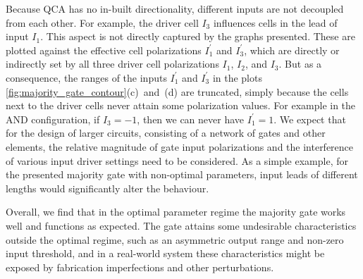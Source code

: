 Because QCA has no in-built directionality, different inputs are not decoupled
from each other. For example, the driver cell $I_3$ influences cells in the lead
of input $I_1$. This aspect is not directly captured by the graphs presented.
These are plotted against the effective cell polarizations $I_1^{\prime}$ and
$I_3^{\prime}$, which are directly or indirectly set by all three driver cell
polarizations $I_1$, $I_2$, and $I_3$. But as a consequence, the ranges of the
inputs $I_1^{\prime}$ and $I_3^{\prime}$ in the plots
\ref{fig:majority_gate_contour}(c)~and~(d) are truncated, simply because the
cells next to the driver cells never attain some polarization values. For
example in the AND configuration, if $I_3 = -1$, then we can never have
$I_1^{\prime} = 1$. We expect that for the design of larger circuits, consisting
of a network of gates and other elements, the relative magnitude of gate input
polarizations and the interference of various input driver settings need to be
considered. As a simple example, for the presented majority gate with
non-optimal parameters, input leads of different lengths would significantly
alter the behaviour.

Overall, we find that in the optimal parameter regime the majority gate works
well and functions as expected. The gate attains some undesirable
characteristics outside the optimal regime, such as an asymmetric output range
and non-zero input threshold, and in a real-world system these characteristics
might be exposed by fabrication imperfections and other perturbations.

